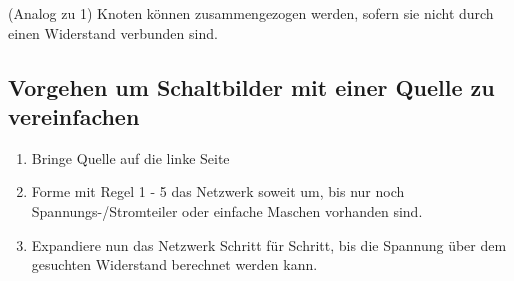 										\iend
					\fix \fix
										\beginip
											(Analog zu 1) Knoten können zusammengezogen werden, sofern sie nicht durch einen Widerstand verbunden sind.
											\begin{center}

											\end{center}
										\iend

										\newpage


										\subsection{Vorgehen um Schaltbilder mit einer Quelle zu vereinfachen}
										\begin{enumerate}
											\item Bringe Quelle auf die linke Seite
											\item Forme mit Regel 1 - 5 das Netzwerk soweit um, bis nur noch Spannungs-/Stromteiler oder einfache Maschen vorhanden sind.
											\item Expandiere nun das Netzwerk Schritt für Schritt, bis die Spannung über dem gesuchten Widerstand berechnet werden kann.
										\end{enumerate}

